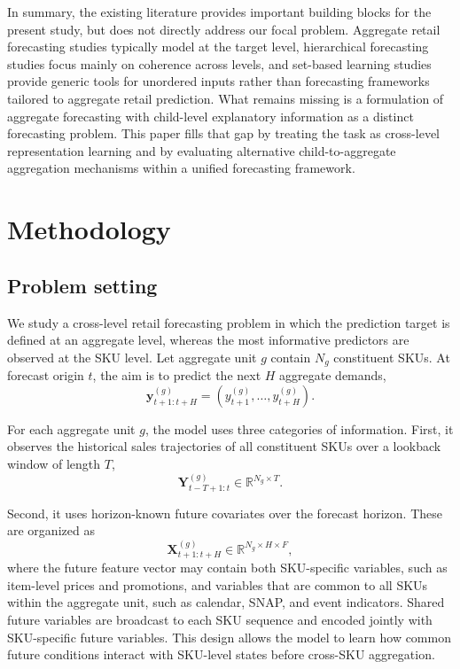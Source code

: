 \documentclass[12pt]{article}
\begin{document}
In summary, the existing literature provides important building blocks for the present study, but does not directly address our focal problem. Aggregate retail forecasting studies typically model at the target level, hierarchical forecasting studies focus mainly on coherence across levels, and set-based learning studies provide generic tools for unordered inputs rather than forecasting frameworks tailored to aggregate retail prediction. What remains missing is a formulation of aggregate forecasting with child-level explanatory information as a distinct forecasting problem. This paper fills that gap by treating the task as cross-level representation learning and by evaluating alternative child-to-aggregate aggregation mechanisms within a unified forecasting framework.

\section{Methodology}
\label{sec:methodology}

\subsection{Problem setting}
\label{subsec:problem_setting}

We study a cross-level retail forecasting problem in which the prediction target is defined at an aggregate level, whereas the most informative predictors are observed at the SKU level. Let aggregate unit $g$ contain $N_g$ constituent SKUs. At forecast origin $t$, the aim is to predict the next $H$ aggregate demands,
\begin{equation*}
  \mathbf{y}^{(g)}_{t+1:t+H}
  =
  \left(
  y^{(g)}_{t+1},\ldots,y^{(g)}_{t+H}
  \right).
\end{equation*}

For each aggregate unit $g$, the model uses three categories of information. First, it observes the historical sales trajectories of all constituent SKUs over a lookback window of length $T$,
\begin{equation*}
  \mathbf{Y}^{(g)}_{t-T+1:t}
  \in
  \mathbb{R}^{N_g \times T}.
\end{equation*}

Second, it uses horizon-known future covariates over the forecast horizon. These are organized as
\begin{equation*}
  \mathbf{X}^{(g)}_{t+1:t+H}
  \in
  \mathbb{R}^{N_g \times H \times F},
\end{equation*}
where the future feature vector may contain both SKU-specific variables, such as item-level prices and promotions, and variables that are common to all SKUs within the aggregate unit, such as calendar, SNAP, and event indicators. Shared future variables are broadcast to each SKU sequence and encoded jointly with SKU-specific future variables. This design allows the model to learn how common future conditions interact with SKU-level states before cross-SKU aggregation.
\end{document}
